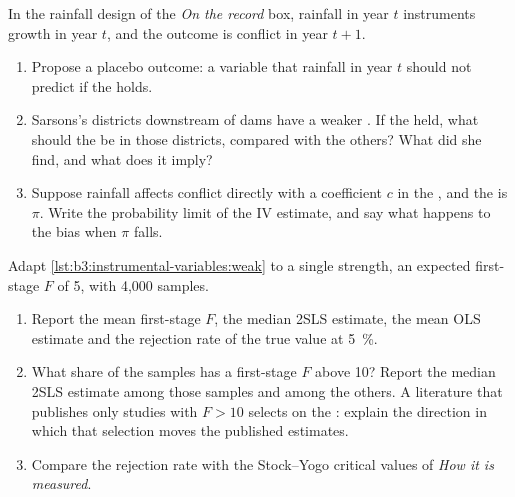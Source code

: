 \begin{exercise}[$\star\star$]\label{exo:b3:instrumental-variables:9}
In the rainfall design of the \emph{On the record} box, rainfall in year $t$
instruments growth in year $t$, and the outcome is conflict in year $t+1$.
\begin{enumerate}
\item Propose a placebo outcome: a variable that rainfall in year $t$ should
not predict if the  holds.
\item Sarsons's districts downstream of dams have a weaker . If the
 held, what should the  be in those
districts, compared with the others? What did she find, and what does it
imply?
\item Suppose rainfall affects conflict directly with a coefficient $c$ in
the , and the  is $\pi$. Write the probability limit of
the IV estimate, and say what happens to the bias when $\pi$ falls.
\end{enumerate}
\end{exercise}

\begin{exercise}[$\star\star\star$]\label{exo:b3:instrumental-variables:10}
Adapt \cref{lst:b3:instrumental-variables:weak} to a single strength, an
expected first-stage $F$ of 5, with 4{,}000 samples.
\begin{enumerate}
\item Report the mean first-stage $F$, the median 2SLS estimate, the mean OLS
estimate and the rejection rate of the true value at 5~\%.
\item What share of the samples has a first-stage $F$ above 10? Report the
median 2SLS estimate among those samples and among the others. A literature
that publishes only studies with $F > 10$ selects on the : explain
the direction in which that selection moves the published estimates.
\item Compare the rejection rate with the Stock--Yogo critical values of
\emph{How it is measured}.
\end{enumerate}
\end{exercise}

